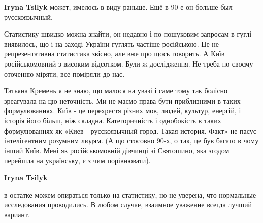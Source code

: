 \begin{itemize}
\begin{itemize}
 
\textbf{Iryna Tsilyk} может, имелось в виду раньше. Ещё в 90-е он больше был русскоязычный.


Статистику швидко можна знайти, он недавно і по пошуковим запросам в гуглі
виявилось, що і на заході України гуглять частіше російською. Це не
репрезентативна статистика звісно, але вже про щось говорить. А Київ
російськомовний з високим відсотком. Були ж дослідження. Не треба по своєму
оточенню міряти, все поміряли до нас.

 

Татьяна Кремень я не знаю, що малося на увазі і саме тому так болісно
зреагувала на цю неточність. Ми не маємо права бути приблизними в таких
формулюваннях. Київ - це перехрестя різних мов, людей, культур, енергій, і
історія його більш, ніж складна. Категоричність і однобокість в таких
формулюваннях як «Киев - русскоязычный город. Такая история. Факт» не пасує
інтелігентним розумним людям. (А що стосовно 90-х, о так, це був багато в чому
інший Київ. Мені як російськомовній дівчинці зі Святошино, яка згодом перейшла
на українську, є з чим порівнювати).


 
\textbf{Iryna Tsilyk} 

в остатке можем опираться только на статистику, но не уверена, что нормальные
исследования проводились. В любом случае, взаимное уважение всегда лучший
вариант.

 


\end{itemize}
\end{itemize}
